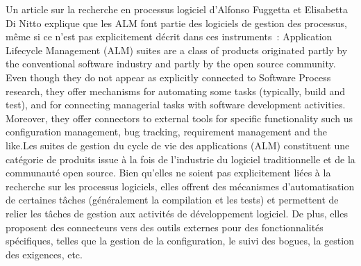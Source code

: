 {Un article sur la recherche en processus logiciel d'Alfonso Fuggetta et Elisabetta Di Nitto explique que les ALM font partie des logiciels de gestion des processus, même si ce n'est pas explicitement décrit dans ces instruments~:
\quoteenfr
{Application Lifecycle Management (ALM) suites are a class of products originated partly by the conventional software industry and partly by the open source community. Even though they do not appear as explicitly connected to Software Process research, they offer mechanisms for automating some tasks (typically, build and test), and for connecting managerial tasks with software development activities. Moreover, they offer connectors to external tools for specific functionality such us configuration management, bug tracking, requirement management and the like.}{Les suites de gestion du cycle de vie des applications (ALM) constituent une catégorie de produits issue à la fois de l'industrie du logiciel traditionnelle et de la communauté open source. Bien qu'elles ne soient pas explicitement liées à la recherche sur les processus logiciels, elles offrent des mécanismes d'automatisation de certaines tâches (généralement la compilation et les tests) et permettent de relier les tâches de gestion aux activités de développement logiciel. De plus, elles proposent des connecteurs vers des outils externes pour des fonctionnalités spécifiques, telles que la gestion de la configuration, le suivi des bogues, la gestion des exigences, etc.}
{\cite{fuggetta_software_2014}}
\vspace{-1\baselineskip}
}{}

